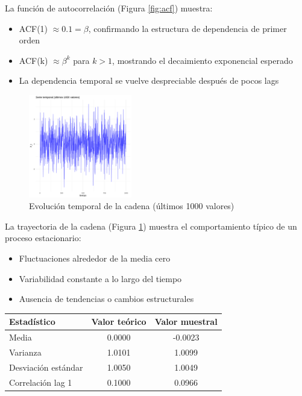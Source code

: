 \documentclass[12pt,a4paper]{article}
\begin{document}
La función de autocorrelación (Figura \ref{fig:acf}) muestra:
\begin{itemize}
    \item ACF(1) $\approx 0.1 = \beta$, confirmando la estructura de dependencia de primer orden
    \item ACF(k) $\approx \beta^k$ para $k > 1$, mostrando el decaimiento exponencial esperado
    \item La dependencia temporal se vuelve despreciable después de pocos lags
\end{itemize}

\begin{figure}[h]
\centering
\includegraphics[width=0.4\textwidth]{images/image_4.png}
\caption{Evolución temporal de la cadena (últimos 1000 valores)}
\label{fig:evolucion}
\end{figure}

La trayectoria de la cadena (Figura \ref{fig:evolucion}) muestra el comportamiento típico de un proceso estacionario:
\begin{itemize}
    \item Fluctuaciones alrededor de la media cero
    \item Variabilidad constante a lo largo del tiempo
    \item Ausencia de tendencias o cambios estructurales
\end{itemize}

\begin{center}
\begin{tabular}{|l|c|c|}
\hline
\textbf{Estadístico} & \textbf{Valor teórico} & \textbf{Valor muestral} \\
\hline
Media & 0.0000 & -0.0023 \\
Varianza & 1.0101 & 1.0099 \\
Desviación estándar & 1.0050 & 1.0049 \\
Correlación lag 1 & 0.1000 & 0.0966 \\
\hline
\end{tabular}
\end{center}
\end{document}
